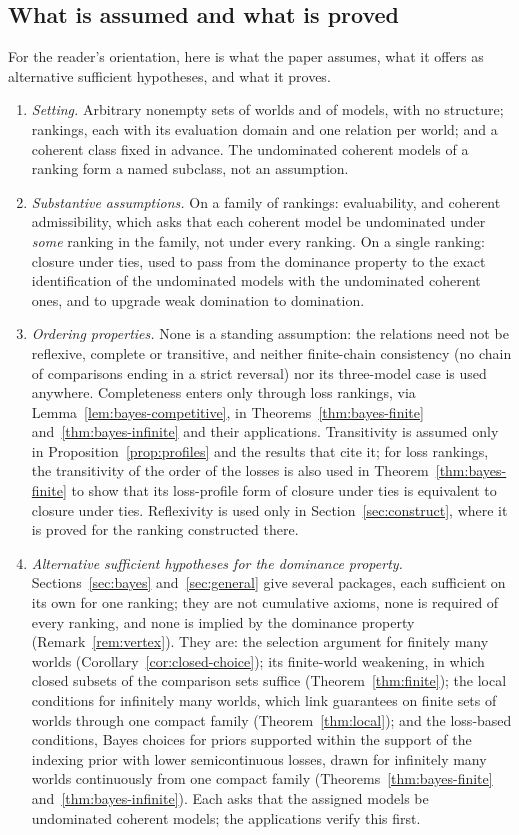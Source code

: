 \documentclass[11pt]{article}
\theoremstyle{definition}
\theoremstyle{remark}
\begin{document}
\subsection{What is assumed and what is proved}\label{sec:inventory}
For the reader's orientation, here is what the paper assumes, what it offers as alternative sufficient hypotheses, and what it proves.
\begin{enumerate}[label=(\arabic*),leftmargin=*]
\item \emph{Setting.} Arbitrary nonempty sets of worlds and of models, with no structure; rankings, each with its evaluation domain and one relation per world; and a coherent class fixed in advance. The undominated coherent models of a ranking form a named subclass, not an assumption.
\item \emph{Substantive assumptions.} On a family of rankings: evaluability, and coherent admissibility, which asks that each coherent model be undominated under \emph{some} ranking in the family, not under every ranking. On a single ranking: closure under ties, used to pass from the dominance property to the exact identification of the undominated models with the undominated coherent ones, and to upgrade weak domination to domination.
\item \emph{Ordering properties.} None is a standing assumption: the relations need not be reflexive, complete or transitive, and neither finite-chain consistency (no chain of comparisons ending in a strict reversal) nor its three-model case is used anywhere. Completeness enters only through loss rankings, via Lemma~\ref{lem:bayes-competitive}, in Theorems~\ref{thm:bayes-finite} and~\ref{thm:bayes-infinite} and their applications. Transitivity is assumed only in Proposition~\ref{prop:profiles} and the results that cite it; for loss rankings, the transitivity of the order of the losses is also used in Theorem~\ref{thm:bayes-finite} to show that its loss-profile form of closure under ties is equivalent to closure under ties. Reflexivity is used only in Section~\ref{sec:construct}, where it is proved for the ranking constructed there.
\item \emph{Alternative sufficient hypotheses for the dominance property.} Sections~\ref{sec:bayes} and~\ref{sec:general} give several packages, each sufficient on its own for one ranking; they are not cumulative axioms, none is required of every ranking, and none is implied by the dominance property (Remark~\ref{rem:vertex}). They are: the selection argument for finitely many worlds (Corollary~\ref{cor:closed-choice}); its finite-world weakening, in which closed subsets of the comparison sets suffice (Theorem~\ref{thm:finite}); the local conditions for infinitely many worlds, which link guarantees on finite sets of worlds through one compact family (Theorem~\ref{thm:local}); and the loss-based conditions, Bayes choices for priors supported within the support of the indexing prior with lower semicontinuous losses, drawn for infinitely many worlds continuously from one compact family (Theorems~\ref{thm:bayes-finite} and~\ref{thm:bayes-infinite}). Each asks that the assigned models be undominated coherent models; the applications verify this first.

\end{enumerate}
\end{document}
